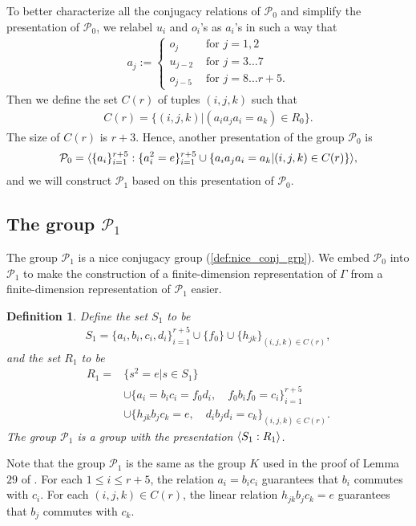 \documentclass[11pt,letterpaper]{article}
\DeclarePairedDelimiter{\ip}{\langle}{\rangle}
\newcommand{\1}{\mathbb{1}}
\newcommand{\Pg}{\mathcal{P}}
\newtheorem{definition}[theorem]{Definition}
\theoremstyle{definition}
\begin{document}
To better characterize all the conjugacy
relations of $\Pg_0$ and simplify the presentation of $\Pg_0$, 
we relabel $u_i$ and $o_i$'s as $a_i$'s in such a way that
\begin{align}
	a_j := 
	\begin{cases}
	 o_j &\text{ for } j = 1,2 \\
	 u_{j-2} &\text{ for } j = 3\dots 7 \\
	 o_{j-5} &\text{ for } j = 8 \dots r+5.
	\end{cases}
\end{align}
Then we define the set $C(r)$ of tuples $(i,j,k)$ such that
\begin{align}
\label{eq:cr}
	C(r) = \{ (i,j,k) |  (a_ia_ja_i = a_k) \in R_0 \}.
\end{align}
The size of $C(r)$ is $r+3$. 
Hence, another presentation of the group $\Pg_0$ is
\begin{align*}
    \Pg_0 = \ip{ \{a_i\}_{i=1}^{r+5} : \{a_i^2 =e \}_{i=1}^{r+5} \cup \{ a_ia_ja_i = a_k \vert (i,j,k) \in C(r)\}},
\end{align*}
and we will construct $\Pg_1$ based on this presentation of $\Pg_0$.

\subsection{The group $\Pg_1$}
\label{sec:g1}
The group $\Pg_1$ is a nice conjugacy group (\cref{def:nice_conj_grp}).
We embed $\Pg_0$ into $\Pg_1$ to
make the construction of a finite-dimension representation of $\Gamma$ from
a finite-dimension representation of $\Pg_1$ easier.
\begin{definition}
\label{def:g1}
Define the set $S_1$ to be
\begin{align*}
	S_1 = \{a_i, b_i, c_i, d_i\}_{i=1}^{r+5} \cup \{ f_0 \} \cup \{h_{jk}\}_{(i,j,k) \in C(r)},
\end{align*}
and the set $R_1$ to be
\begin{align*}
	R_1 = &\{ s^2 = e \vert s \in S_1\}\\ 
	&\cup 
	\{a_i = b_ic_i = f_0d_i, \quad f_0b_if_0 =c_i\}_{i= 1}^{r+5} \\ 
	&\cup
	\{h_{jk}b_j c_k = e, \quad d_ib_jd_i = c_k\}_{(i,j,k) \in C(r)}.
\end{align*}
The group $\Pg_1$ is a group with the presentation $\ip{S_1 : R_1}$.
\end{definition}
Note that the group $\Pg_1$ is the same as the group $K$ used in the proof of Lemma $29$ of \cite{slofstra2017}.
For each $1 \leq i \leq r+5$, the relation $a_i = b_ic_i$ guarantees that $b_i$ commutes with $c_i$.
For each $(i,j,k) \in C(r)$, the linear relation $h_{jk} b_j c_k = e$ guarantees that
$b_j$ commutes with $c_k$.
\end{document}
